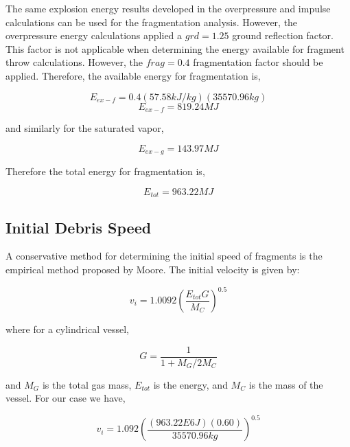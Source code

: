 \documentclass[10pt,parskip=half,
toc=sectionentrywithdots,
bibliography=totocnumbered,
captions=tableheading,numbers=noendperiod]{scrartcl}
\begin{document}
The same explosion energy results developed in the overpressure and
impulse calculations can be used for the fragmentation analysis.
However, the overpressure energy calculations applied a \(grd=1.25\)
ground reflection factor. This factor is not applicable when determining
the energy available for fragment throw calculations. However, the
\(frag=0.4\) fragmentation factor should be applied. Therefore, the
available energy for fragmentation is,

\begin{equation}E_{ex-f}=0.4(57.58kJ/kg)(35570.96kg)\end{equation}
\begin{equation}E_{ex-f}=819.24MJ\end{equation}

and similarly for the saturated vapor,

\begin{equation}E_{ex-g}=143.97MJ\end{equation}

Therefore the total energy for fragmentation is,

\begin{equation}E_{tot} = 963.22MJ\end{equation}

\hypertarget{initial-debris-speed}{%
\subsection{Initial Debris Speed}\label{initial-debris-speed}}

A conservative method for determining the initial speed of fragments is
the empirical method proposed by Moore\cite{moore1967}. The initial
velocity is given by:

\begin{equation}v_i = 1.0092\left(\frac{E_{tot}G}{M_C}\right)^{0.5}\end{equation}

where for a cylindrical vessel,

\begin{equation}G = \frac{1}{1+M_G/2M_C}\end{equation}

and \(M_G\) is the total gas mass, \(E_{tot}\) is the energy, and
\(M_C\) is the mass of the vessel. For our case we have,

\begin{equation}v_i = 1.092\left(\frac{(963.22E6J)(0.60)}{35570.96kg}\right)^{0.5}\end{equation}
\end{document}
